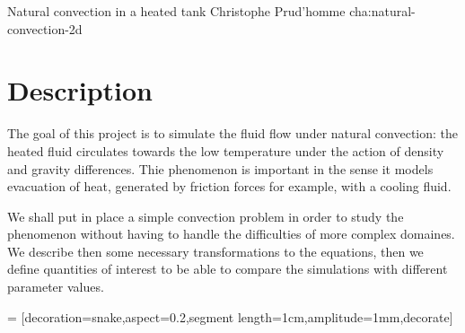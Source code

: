             {Natural convection in a heated tank}
            {Christophe Prud'homme}
            {cha:natural-convection-2d}

\newcommand{\Gr}{\ensuremath{\mathrm{Gr}\xspace}}
\renewcommand{\Pr}{\ensuremath{\mathrm{Pr}\xspace}}

\section{Description}
\label{sec:description}

The goal of this project is to simulate the fluid flow under natural
convection: the heated fluid circulates towards the low temperature
under the action of density and gravity differences. Thie phenomenon
is important in the sense it models evacuation of heat, generated by
friction forces for example, with  a cooling fluid.

We shall put in place a simple convection problem in order to study
the phenomenon without having to handle the difficulties of more
complex domaines. We describe then some necessary transformations to
the equations, then we define quantities of interest to be able to
compare the simulations with different parameter values.


\newcommand{\Water}{\text{\textsc{Water}}\xspace}
\newcommand{\Fluid}{\text{\textsc{Fluid}}\xspace}
 = [decoration={snake,aspect=0.2,segment length=1cm,amplitude=1mm},decorate]

